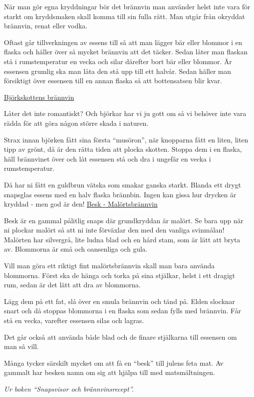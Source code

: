 \vspace{10pt}
\setlength{\parindent}{15pt}
När man gör egna kryddningar bör det brännvin 
man använder helst inte vara för starkt om kryddsmaken 
skall komma till sin fulla rätt. Man utgår från okryddat 
brännvin, renat eller vodka.

Oftast går tillverkningen av essens till så att man 
lägger bär eller blommor i en flaska och häller över så 
mycket brännvin att det täcker. Sedan låter man flaskan 
stå i rumstemperatur en vecka och silar därefter bort bär 
eller blommor. Är essensen grumlig ska man låta den stå 
upp till ett halvår. Sedan häller man försiktigt över 
essensen till en annan flaska så att bottensatsen blir kvar.\par
\vspace{10pt}
\noindent\underline{Björkskottens brännvin}\par
\vspace{10pt}
Låter det inte romantiskt? Och björkar har vi ju gott 
om så vi behöver inte vara rädda för att göra någon större 
skada i naturen.

Strax innan björken fått sina första ``musöron'', när 
knopparna fått en liten, liten tipp av grönt, då är den rätta 
tiden att plocka skotten. Stoppa dem i en flaska, häll 
brännvinet över och låt essensen stå och dra i ungefär en 
vecka i rumstemperatur.

Då har ni fått en guldbrun vätska som smakar 
ganska starkt. Blanda ett drygt snapsglas essens med en 
halv flaska brännbin. Ingen kan gissa hur drycken är 
kryddad - men god är den!
\newpage
\noindent\underline{Besk - Malörtsbrännvin}\par
\vspace{10pt}
Besk är en gammal pålitlig snaps där grundkryddan 
är malört. Se bara upp när ni plockar malört så att ni inte 
förväxlar den med den vanliga svinmålan! Malörten har 
silvergrå, lite ludna blad och en hård stam, som är lätt att 
bryta av. Blommorna är små och oansenliga och gula.

Vill man göra ett riktigt fint malörtsbrännvin skall 
man bara använda blommorna. Först ska de hänga och 
torka på sina stjälkar, helst i ett dragigt rum, sedan är det 
lätt att dra av blommorna.

Lägg dem på ett fat, slå över en smula brännvin och 
tänd på. Elden slocknar snart och då stoppas blommorna i 
en flaska som sedan fylls med brännvin. Får stå en vecka, 
varefter essensen silas och lagras.

Det går också att använda både blad och de finare 
stjälkarna till essensen om man så vill.

Många tycker särskilt mycket om att få en ``besk'' 
till julens feta mat. Av gammalt har besken namn om sig 
att hjälpa till med matsmältningen.\par
\setlength{\parindent}{0pt}
\vspace{10pt}
{\footnotesize\textit{Ur boken ``Snapsvisor och brännvinsrecept''.}}
